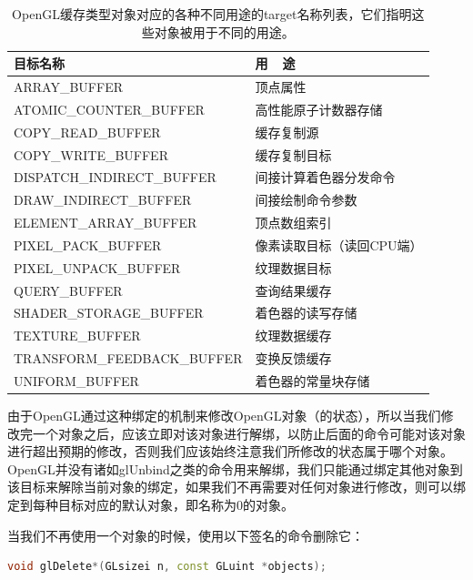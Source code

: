 \begin{table}
\caption{OpenGL缓存类型对象对应的各种不同用途的target名称列表，它们指明这些对象被用于不同的用途。}
\label{t:api-buffer-target}
\centering
\begin{tabular}{>{\small}p{}|>{\small}p{}}
\hline 
   目标名称 & 用~~途  \\
    \hline  
  ARRAY\_BUFFER                &顶点属性\\
  ATOMIC\_COUNTER\_BUFFER      &高性能原子计数器存储\\
  COPY\_READ\_BUFFER           &缓存复制源\\
  COPY\_WRITE\_BUFFER          &缓存复制目标\\
  DISPATCH\_INDIRECT\_BUFFER   &间接计算着色器分发命令\\
  DRAW\_INDIRECT\_BUFFER       &间接绘制命令参数\\
  ELEMENT\_ARRAY\_BUFFER       &顶点数组索引\\
  PIXEL\_PACK\_BUFFER          &像素读取目标（读回CPU端）\\
  PIXEL\_UNPACK\_BUFFER        &纹理数据目标\\
  QUERY\_BUFFER                &查询结果缓存\\
  SHADER\_STORAGE\_BUFFER      &着色器的读写存储\\
  TEXTURE\_BUFFER              &纹理数据缓存\\
  TRANSFORM\_FEEDBACK\_BUFFER  &变换反馈缓存\\
  UNIFORM\_BUFFER              &着色器的常量块存储\\

 \hline 
\end{tabular}
\end{table}

由于OpenGL通过这种绑定的机制来修改OpenGL对象（的状态），所以当我们修改完一个对象之后，应该立即对该对象进行解绑，以防止后面的命令可能对该对象进行超出预期的修改，否则我们应该始终注意我们所修改的状态属于哪个对象。OpenGL并没有诸如glUnbind之类的命令用来解绑，我们只能通过绑定其他对象到该目标来解除当前对象的绑定，如果我们不再需要对任何对象进行修改，则可以绑定到每种目标对应的默认对象，即名称为0的对象。

当我们不再使用一个对象的时候，使用以下签名的命令删除它：

\begin{lstlisting}[language=C++]
void glDelete*(GLsizei n​, const GLuint *objects​);
\end{lstlisting}


